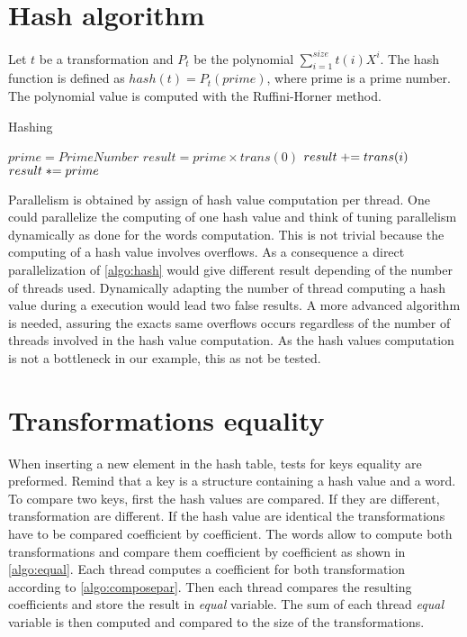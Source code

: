 {\section{Hash algorithm}
Let $t$ be a transformation and $P_{t}$ be the polynomial $\displaystyle\sum_{i=1}^{size} t(i)X^i$. The hash function is defined as $hash(t) = P_{t}(prime)$, where prime is a prime number.
The polynomial value is computed with the Ruffini-Horner method.
\begin{algorithm}
\caption{Hashing}
\label{algo:hash}
\begin{algorithmic}
\STATE $prime = PrimeNumber$
\STATE $result = prime \times trans(0)$
\STATE $\switch result += trans(i)$
\STATE $\switch result *= prime$
\ENDFOR
\end{algorithmic}
\end{algorithm}
Parallelism is obtained by assign of hash value computation per thread.
One could parallelize the computing of one hash value and think of tuning parallelism dynamically as done for the words computation. This is not trivial because the computing of a hash value involves overflows. As a consequence a direct parallelization of \autoref{algo:hash} would give different result depending of the number of threads used. Dynamically adapting the number of thread computing a hash value during a execution would lead two false results. A more advanced algorithm is needed, assuring the exacts same overflows occurs regardless of the number of threads involved in the hash value computation. As the hash values computation is not a bottleneck in our example, this as not be tested.


\section{Transformations equality}
\label{part:equality}
When inserting a new element in the hash table, tests for keys equality are preformed.
Remind that a key is a structure containing a hash value and a word.
To compare two keys, first the hash values are compared. If they are different, transformation are different.
If the hash value are identical the transformations have to be compared coefficient by coefficient. The words allow to compute both transformations and compare them coefficient by coefficient as shown in \autoref{algo:equal}.
Each thread computes a coefficient for both transformation according to \autoref{algo:composepar}. Then each thread compares the resulting coefficients and store the result in \emph{equal} variable. The sum of each thread \emph{equal} variable is then computed and compared to the size of the transformations.
 
}
